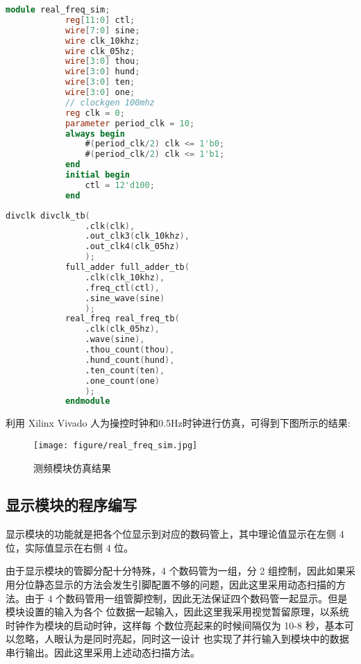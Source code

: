 {\begin{spacing}{1.5}
			\begin{lstlisting}[language=Verilog]
			module real_freq_sim;
			reg[11:0] ctl;
			wire[7:0] sine;
			wire clk_10khz;
			wire clk_05hz;
			wire[3:0] thou;
			wire[3:0] hund;
			wire[3:0] ten;
			wire[3:0] one;
			// clockgen 100mhz
			reg clk = 0;
			parameter period_clk = 10;
			always begin
				#(period_clk/2) clk <= 1'b0;
				#(period_clk/2) clk <= 1'b1;
			end
			initial begin
				ctl = 12'd100;
			end
			\end{lstlisting}
			\begin{lstlisting}[language=Verilog]
			divclk divclk_tb(
				.clk(clk), 
				.out_clk3(clk_10khz),
				.out_clk4(clk_05hz)
				);
			full_adder full_adder_tb(
				.clk(clk_10khz),
				.freq_ctl(ctl),
				.sine_wave(sine)
				);
			real_freq real_freq_tb(
				.clk(clk_05hz),
				.wave(sine),
				.thou_count(thou),
				.hund_count(hund),
				.ten_count(ten),
				.one_count(one)
				);
			endmodule
			\end{lstlisting}

			利用 Xilinx Vivado 人为操控时钟和0.5Hz时钟进行仿真，可得到下图所示的结果:
			\newline
			\begin{figure}[htbp]
				\centering
				\texttt{[image: figure/real\_freq\_sim.jpg]}
				\caption{测频模块仿真结果}\label{fig:real_freq_sim}
			\end{figure}

		\subsection{显示模块的程序编写}
			显示模块的功能就是把各个位显示到对应的数码管上，其中理论值显示在左侧 4 位，实际值显示在右侧 4 位。

			由于显示模块的管脚分配十分特殊，4 个数码管为一组，分 2 组控制，因此如果采用分位静态显示的方法会发生引脚配置不够的问题，因此这里采用动态扫描的方法。由于 4 个数码管用一组管脚控制，因此无法保证四个数码管一起显示。但是模块设置的输入为各个 位数据一起输入，因此这里我采用视觉暂留原理，以系统时钟作为模块的启动时钟，这样每 个数位亮起来的时候间隔仅为 10-8 秒，基本可以忽略，人眼认为是同时亮起，同时这一设计 也实现了并行输入到模块中的数据串行输出。因此这里采用上述动态扫描方法。


\end{spacing}}
